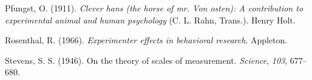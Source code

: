 \documentclass[
  a4paper,
]{book}
\newlength{\cslhangindent}
\newlength{\cslentryspacingunit} %
\newenvironment{CSLReferences}[2] %
 {%
  \setlength{\parindent}{0pt}
  \ifodd #1
  \let\oldpar\par
  \def\par{\hangindent=\cslhangindent\oldpar}
  \fi
  \setlength{\parskip}{#2\cslentryspacingunit}
 }%
 {}
\begin{document}
\begin{CSLReferences}{1}{0}
\leavevmode{}%
Pfungst, O. (1911). \emph{Clever hans (the horse of mr. Von osten): A
contribution to experimental animal and human psychology} (C. L. Rahn,
Trans.). Henry Holt.

\leavevmode{}%
Rosenthal, R. (1966). \emph{Experimenter effects in behavioral
research}. Appleton.

\leavevmode{}%
Stevens, S. S. (1946). On the theory of scales of measurement.
\emph{Science}, \emph{103}, 677--680.

\end{CSLReferences}


\backmatter

\printindex

\end{document}
